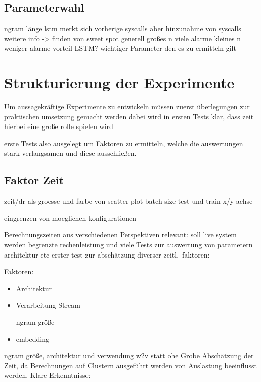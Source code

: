         \subsection{Parameterwahl}
            ngram länge
            lstm merkt sich vorherige syscalls aber hinzunahme von syscalls weitere info
            -> finden von sweet spot
            generell großes n viele alarme
            kleines n weniger alarme  vorteil LSTM\@?
            wichtiger Parameter den es zu ermitteln gilt

    \section{Strukturierung der Experimente}\label{sec:StrukExp}
        Um aussagekräftige Experimente zu entwickeln müssen zuerst 
        überlegungen zur praktischen umsetzung gemacht werden
        dabei wird in ersten Tests klar, dass zeit hierbei eine große rolle spielen wird

        erste Tests also ausgelegt um Faktoren zu ermitteln, welche die auswertungen stark verlangsamen
        und diese ausschließen.

        \subsection{Faktor Zeit}

            zeit/dr als groesse und farbe von scatter plot
            batch size test und train x/y achse

            eingrenzen von moeglichen konfigurationen

            Berechnungszeiten aus verschiedenen Perspektiven relevant:
            soll live system werden
            begrenzte rechenleistung und viele Tests zur auswertung von parametern architektur etc
            erster test zur abschätzung diverser zeitl.\ faktoren:

            Faktoren:
            \begin{itemize}
                \item Architektur
                \item Verarbeitung Stream

                     ngram größe
                \item embedding
            \end{itemize}
        ngram größe, architektur und verwendung w2v statt ohe
        Grobe Abschätzung der Zeit, da Berechnungen auf Clustern ausgeführt werden von Auslastung beeinflusst werden.
        Klare Erkenntnisse:

